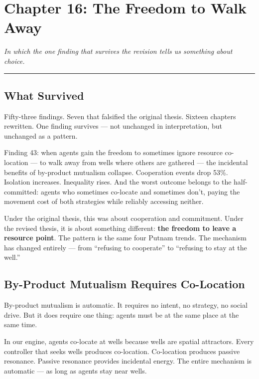 \chapter{Chapter 16: The Freedom to Walk Away}\label{chapter-16-the-freedom-to-walk-away}

\emph{In which the one finding that survives the revision tells us something about choice.}

\begin{center}\rule{0.5\linewidth}{0.5pt}\end{center}

\section{What Survived}\label{what-survived}

Fifty-three findings. Seven that falsified the original thesis. Sixteen chapters rewritten. One finding survives --- not unchanged in interpretation, but unchanged as a pattern.

Finding 43: when agents gain the freedom to sometimes ignore resource co-location --- to walk away from wells where others are gathered --- the incidental benefits of by-product mutualism collapse. Cooperation events drop 53\%. Isolation increases. Inequality rises. And the worst outcome belongs to the half-committed: agents who sometimes co-locate and sometimes don't, paying the movement cost of both strategies while reliably accessing neither.

Under the original thesis, this was about cooperation and commitment. Under the revised thesis, it is about something different: \textbf{the freedom to leave a resource point}. The pattern is the same four Putnam trends. The mechanism has changed entirely --- from ``refusing to cooperate'' to ``refusing to stay at the well.''

\section{By-Product Mutualism Requires Co-Location}\label{by-product-mutualism-requires-co-location}

By-product mutualism is automatic. It requires no intent, no strategy, no social drive. But it does require one thing: agents must be at the same place at the same time.

In our engine, agents co-locate at wells because wells are spatial attractors. Every controller that seeks wells produces co-location. Co-location produces passive resonance. Passive resonance provides incidental energy. The entire mechanism is automatic --- as long as agents stay near wells.


